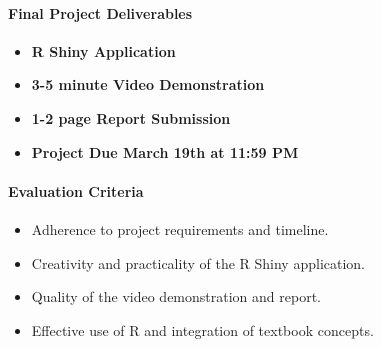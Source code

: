 \documentclass[
  letterpaper,
  DIV=11,
  numbers=noendperiod]{scrartcl}
\let\oldparagraph\paragraph
\renewcommand{\paragraph}[1]{\oldparagraph{#1}\mbox{}}
\providecommand{\tightlist}{%
  \setlength{\itemsep}{0pt}\setlength{\parskip}{0pt}}\usepackage{longtable,booktabs,array}
\begin{document}
\hypertarget{final-project-deliverables}{%
\paragraph{Final Project
Deliverables}\label{final-project-deliverables}}

\begin{itemize}
\tightlist
\item
  \textbf{R Shiny Application}
\item
  \textbf{3-5 minute Video Demonstration}
\item
  \textbf{1-2 page Report Submission}
\item
  \textbf{Project Due March 19th at 11:59 PM}
\end{itemize}

\hypertarget{evaluation-criteria}{%
\paragraph{\texorpdfstring{\textbf{Evaluation
Criteria}}{Evaluation Criteria}}\label{evaluation-criteria}}

\begin{itemize}
\tightlist
\item
  Adherence to project requirements and timeline.
\item
  Creativity and practicality of the R Shiny application.
\item
  Quality of the video demonstration and report.
\item
  Effective use of R and integration of textbook concepts.
\end{itemize}
\end{document}
